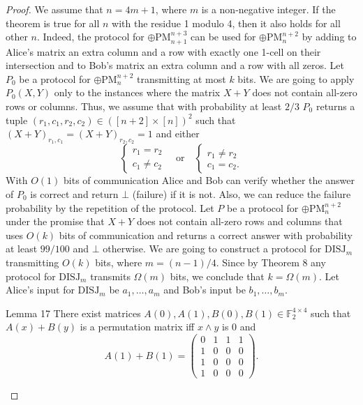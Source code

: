 \begin{proof}
We assume that $n=4m+1$, where $m$ is a non-negative integer. If the theorem is true for all $n$ with the residue 1 modulo 4, then it also holds for all other $n$. Indeed, the protocol for $\oplus\mathrm{PM}_{n+1}^{n+3}$ can be used for $\oplus\mathrm{PM}_n^{n+2}$ by adding to Alice's matrix an extra column and a row with exactly one 1-cell on their intersection and to Bob's matrix an extra column and a row with all zeros.
Let $P_0$ be a protocol for $\oplus\mathrm{PM}_n^{n+2}$ transmitting at most $k$ bits. We are going to apply $P_0(X,Y)$ only to the instances where the matrix $X+Y$ does not contain all-zero rows or columns. Thus, we assume that with probability at least $2/3$ $P_0$ returns a tuple $(r_1,c_1,r_2,c_2)\in([n+2]\times[n])^2$ such that $(X+Y)_{r_1,c_1}=(X+Y)_{r_2,c_2}=1$ and either
\[
\begin{cases}r_1=r_2\\c_1\ne c_2\end{cases}
\quad\text{or}\quad
\begin{cases}r_1\ne r_2\\c_1=c_2.\end{cases}
\]
With $O(1)$ bits of communication Alice and Bob can verify whether the answer of $P_0$ is correct and return $\bot$ (failure) if it is not. Also, we can reduce the failure probability by the repetition of the protocol. Let $P$ be a protocol for $\oplus\mathrm{PM}_n^{n+2}$ under the promise that $X+Y$ does not contain all-zero rows and columns that uses $O(k)$ bits of communication and returns a correct answer with probability at least $99/100$ and $\bot$ otherwise.
We are going to construct a protocol for $\mathrm{DISJ}_m$ transmitting $O(k)$ bits, where $m=(n-1)/4$. Since by Theorem 8 any protocol for $\mathrm{DISJ}_m$ transmits $\Omega(m)$ bits, we conclude that $k=\Omega(m)$. Let Alice's input for $\mathrm{DISJ}_m$ be $a_1,\ldots,a_m$ and Bob's input be $b_1,\ldots,b_m$.
\begin{authorclaim}{Lemma 17}
There exist matrices $A(0),A(1),B(0),B(1)\in\mathbb F_2^{4\times4}$ such that $A(x)+B(y)$ is a permutation matrix iff $x\wedge y$ is 0 and
\begin{equation}
A(1)+B(1)=\begin{pmatrix}0&1&1&1\\1&0&0&0\\1&0&0&0\\1&0&0&0\end{pmatrix}.
\tag{1}
\end{equation}

\end{authorclaim}
\end{proof}
